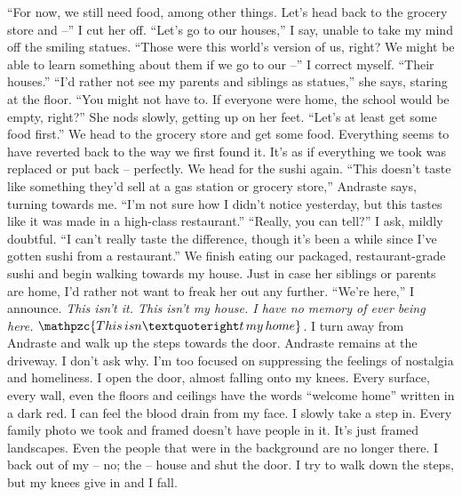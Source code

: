 \documentclass[a4paper, 12pt]{book}
\newcommand\tab[1][1cm]{\hspace*{#1}}
\begin{document}
\newline
\tab
``For now, we still need food, among other things. Let’s head back to the grocery store and --'' I cut her off.
\newline
\tab
``Let’s go to our houses,'' I say, unable to take my mind off the smiling statues. ``Those were this world’s version of us, right? We might be able to learn something about them if we go to our --'' I correct myself. ``Their houses.''
\newline
\tab
``I’d rather not see my parents and siblings as statues,'' she says, staring at the floor.
\newline
\tab
``You might not have to. If everyone were home, the school would be empty, right?''
\newline
\tab
She nods slowly, getting up on her feet. ``Let’s at least get some food first.'' 
\newline
\tab
We head to the grocery store and get some food. Everything seems to have reverted back to the way we first found it. It’s as if everything we took was replaced or put back -- perfectly. We head for the sushi again. ``This doesn’t taste like something they’d sell at a gas station or grocery store,'' Andraste says, turning towards me. ``I’m not sure how I didn’t notice yesterday, but this tastes like it was made in a high-class restaurant.''
\newline
\tab
``Really, you can tell?'' I ask, mildly doubtful. ``I can’t really taste the difference, though it’s been a while since I’ve gotten sushi from a restaurant.''
\newline
\tab
We finish eating our packaged, restaurant-grade sushi and begin walking towards my house. Just in case her siblings or parents are home, I’d rather not want to freak her out any further. ``We’re here,'' I announce. \textit{This isn’t it. This isn’t my house. I have no memory of ever being here.} $\mathpzc{This\, isn’t\, my\, home}$. I turn away from Andraste and walk up the steps towards the door. Andraste remains at the driveway. I don’t ask why. I’m too focused on suppressing the feelings of nostalgia and homeliness. I open the door, almost falling onto my knees. Every surface, every wall, even the floors and ceilings have the words ``welcome home'' written in a dark red. I can feel the blood drain from my face. I slowly take a step in. Every family photo we took and framed doesn’t have people in it. It’s just framed landscapes. Even the people that were in the background are no longer there. I back out of my -- no; the -- house and shut the door. I try to walk down the steps, but my knees give in and I fall.
\end{document}
